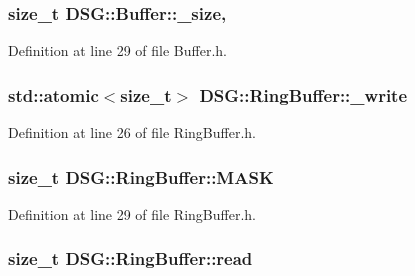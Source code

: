 \hypertarget{classDSG_1_1Buffer_a4e2fef9ed617af2554b25c999def8f71}{
\subsubsection[{\+\_\+size}]{\setlength{\rightskip}{0pt plus 5cm}size\+\_\+t D\+S\+G\+::\+Buffer\+::\+\_\+size\hspace{0.3cm}{\ttfamily [protected]}, {\ttfamily [inherited]}}}\label{classDSG_1_1Buffer_a4e2fef9ed617af2554b25c999def8f71}


Definition at line 29 of file Buffer.\+h.

\hypertarget{classDSG_1_1RingBuffer_a78bd7704fd059b745bc82421e1062123}{
\subsubsection[{\+\_\+write}]{\setlength{\rightskip}{0pt plus 5cm}std\+::atomic$<$size\+\_\+t$>$ D\+S\+G\+::\+Ring\+Buffer\+::\+\_\+write\hspace{0.3cm}{\ttfamily [protected]}}}\label{classDSG_1_1RingBuffer_a78bd7704fd059b745bc82421e1062123}


Definition at line 26 of file Ring\+Buffer.\+h.

\hypertarget{classDSG_1_1RingBuffer_a2fba2ff6ee3886101f0f58b0fd7f3641}{
\subsubsection[{M\+A\+S\+K}]{\setlength{\rightskip}{0pt plus 5cm}size\+\_\+t D\+S\+G\+::\+Ring\+Buffer\+::\+M\+A\+S\+K\hspace{0.3cm}{\ttfamily [protected]}}}\label{classDSG_1_1RingBuffer_a2fba2ff6ee3886101f0f58b0fd7f3641}


Definition at line 29 of file Ring\+Buffer.\+h.

\hypertarget{classDSG_1_1RingBuffer_a34bc659c286c8913e318c0e8c0777204}{
\subsubsection[{read}]{\setlength{\rightskip}{0pt plus 5cm}size\+\_\+t D\+S\+G\+::\+Ring\+Buffer\+::read\hspace{0.3cm}{\ttfamily [protected]}}}\label{classDSG_1_1RingBuffer_a34bc659c286c8913e318c0e8c0777204}



